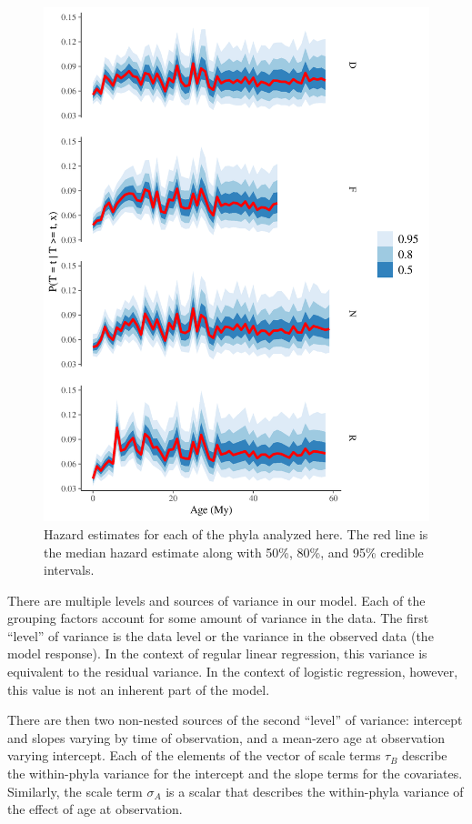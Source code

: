 \documentclass[12pt,letterpaper]{article}
\begin{document}
\begin{figure}[ht]
  \centering
  \includegraphics[width=\textwidth,height=0.5\textheight,keepaspectratio=true]{figure/hazard_bygroup}
  \caption{Hazard estimates for each of the phyla analyzed here. The red line is the median hazard estimate along with 50\%, 80\%, and 95\% credible intervals.}
  \label{fig:hazard_bygroup}
\end{figure}


There are multiple levels and sources of variance in our model. Each of the grouping factors account for some amount of variance in the data. The first ``level'' of variance is the data level or the variance in the observed data (the model response). In the context of regular linear regression, this variance is equivalent to the residual variance. In the context of logistic regression, however, this value is not an inherent part of the model.

There are then two non-nested sources of the second ``level'' of variance: intercept and slopes varying by time of observation, and a mean-zero age at observation varying intercept. Each of the elements of the vector of scale terms \(\tau_{B}\) describe the within-phyla variance for the intercept and the slope terms for the covariates. Similarly, the scale term \(\sigma_{A}\) is a scalar that describes the within-phyla variance of the effect of age at observation. 
\end{document}
